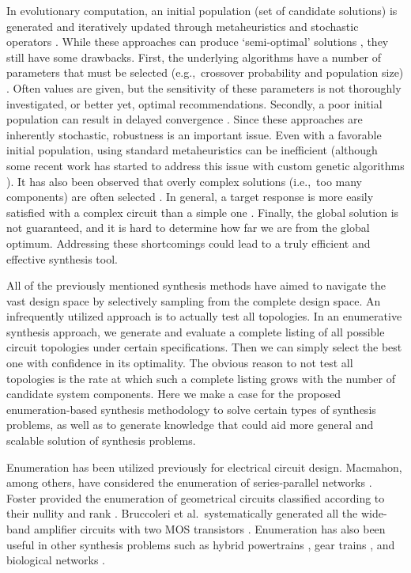 In evolutionary computation, an initial population (set of candidate solutions) is generated and iteratively updated through metaheuristics and stochastic operators \cite{Eiben2003a}.
While these approaches  can produce `semi-optimal' solutions \cite{Das2007a}, they still have some drawbacks. 
First, the underlying algorithms have a number of parameters that must be selected (e.g.,~crossover probability and population size) \cite{Eiben2003a, Grimbleby1995a, Goh2001a, Koza1997a, Lohn1999a}.
Often values are given, but the sensitivity of these parameters is not thoroughly investigated, or better yet, optimal recommendations.
Secondly, a poor initial population can result in delayed convergence \cite{Das2007a}.
Since these approaches are inherently stochastic, robustness is an important issue.
Even with a favorable initial population, using standard metaheuristics can be inefficient (although some recent work has started to address this issue with custom genetic algorithms \cite{Das2007a}).
It has also been observed that overly complex solutions (i.e.,~too many components) are often selected \cite{Goh2001a, Grimbleby1995a, Grimbleby2000a}. 
In general, a target response is more easily satisfied with a complex circuit than a simple one \cite{Grimbleby1995a}.
Finally, the global solution is not guaranteed, and it is hard to determine how far we are from the global optimum.
Addressing these shortcomings could lead to a truly efficient and effective synthesis tool.

All of the previously mentioned synthesis methods have aimed to navigate the vast design space by selectively sampling from the complete design space.
An infrequently utilized approach is to actually test all topologies. %
In an enumerative synthesis approach, we generate and evaluate a complete listing of all possible circuit topologies under certain specifications.
Then we can simply select the best one with confidence in its optimality.
The obvious reason to not test all topologies is the rate at which such a complete listing grows with the number of candidate system components. Here we make a case for the proposed enumeration-based synthesis methodology to solve certain types of synthesis problems, as well as to generate knowledge that could aid more general and scalable solution of synthesis problems.

Enumeration has been utilized previously for electrical circuit design.
Macmahon, among others, have considered the enumeration of series-parallel networks \cite{Macmahon1994a, Lomnicki1972a, Isokawa2016a}.
Foster provided the enumeration of geometrical circuits classified according to their nullity and rank \cite{Foster1932a}.
Bruccoleri et al.~systematically generated all the wide-band amplifier circuits with two MOS transistors \cite{Bruccoleri2001a, Klumperink1997a}. 
Enumeration has also been useful in other synthesis problems such as hybrid powertrains \cite{Bayrak2016a}, gear trains \cite{Castillo2002a}, and biological networks \cite{Ma2009a}.

